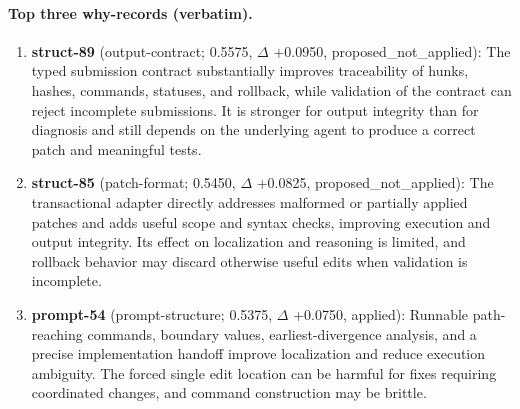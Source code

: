 \paragraph{Top three why-records (verbatim).}\begin{enumerate}\itemsep1pt
\item \textbf{struct-89} (output-contract; 0.5575, $\Delta$ +0.0950, proposed\_not\_applied): The typed submission contract substantially improves traceability of hunks, hashes, commands, statuses, and rollback, while validation of the contract can reject incomplete submissions. It is stronger for output integrity than for diagnosis and still depends on the underlying agent to produce a correct patch and meaningful tests.
\item \textbf{struct-85} (patch-format; 0.5450, $\Delta$ +0.0825, proposed\_not\_applied): The transactional adapter directly addresses malformed or partially applied patches and adds useful scope and syntax checks, improving execution and output integrity. Its effect on localization and reasoning is limited, and rollback behavior may discard otherwise useful edits when validation is incomplete.
\item \textbf{prompt-54} (prompt-structure; 0.5375, $\Delta$ +0.0750, applied): Runnable path-reaching commands, boundary values, earliest-divergence analysis, and a precise implementation handoff improve localization and reduce execution ambiguity. The forced single edit location can be harmful for fixes requiring coordinated changes, and command construction may be brittle.
\end{enumerate}
